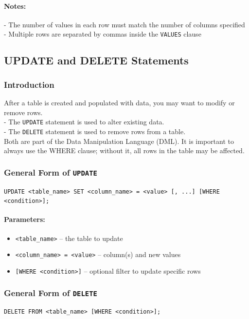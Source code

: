 \documentclass{article}
\begin{document}
\paragraph{Notes:}
- The number of values in each row must match the number of columns specified  
- Multiple rows are separated by commas inside the \texttt{VALUES} clause



\subsection{UPDATE and DELETE Statements}

\subsubsection{Introduction}
After a table is created and populated with data, you may want to modify or remove rows.  
\\
- The \texttt{UPDATE} statement is used to alter existing data. 
\\ 
- The \texttt{DELETE} statement is used to remove rows from a table.  
\\
Both are part of the Data Manipulation Language (DML).  
It is important to always use the WHERE clause; without it, all rows in the table may be affected.

\subsubsection{General Form of \texttt{UPDATE}}
\begin{FormulaBox}
\texttt{UPDATE <table\_name> SET <column\_name> = <value> [, ...] [WHERE <condition>];}
\end{FormulaBox}

\paragraph{Parameters:}
\begin{itemize}
    \item \texttt{<table\_name>} – the table to update  
    \item \texttt{<column\_name> = <value>} – column(s) and new values  
    \item \texttt{[WHERE <condition>]} – optional filter to update specific rows
\end{itemize}

\subsubsection{General Form of \texttt{DELETE}}
\begin{FormulaBox}
\texttt{DELETE FROM <table\_name> [WHERE <condition>];}
\end{FormulaBox}
\end{document}
